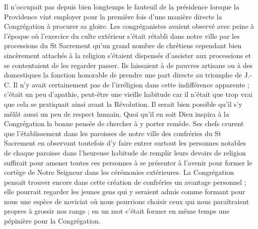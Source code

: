 Il n'occupait pas depuis bien longtemps le fauteuil de la présidence lorsque la Providence vint employer pour la première fois d'une manière directe la Congrégation à procurer sa gloire. Les congréganistes avaient observé avec peine à l'époque où l'exercice du culte extérieur s'était rétabli dans notre ville par les processions du St Sacrement qu'un grand nombre de chrétiens cependant bien sincèrement attachés à la religion s'étaient dispensés d'assister aux processions et se contentaient de les regarder passer. Ils laissaient à de pauvres artisans ou à des domestiques la fonction honorable de prendre une part directe au triomphe de J.-C. Il n'y avait certainement pas de l'irréligion dans cette indifférence apparente ; c'était un peu d'apathie, peut-être une vieille habitude car il n'était que trop vrai que cela se pratiquait ainsi avant la Révolution. Il serait bien possible qu'il s'y mêlât aussi un peu de respect humain. Quoi qu'il en soit Dieu inspira à la Congrégation la bonne pensée de chercher à y porter remède. Ses chefs crurent que l'établissement dans les paroisses de notre ville des confréries
du St Sacrement en observant toutefois d'y faire entrer surtout les personnes notables de chaque paroisse dans l'heureuse habitude de remplir leurs devoirs de religion suffirait pour amener toutes ces personnes à se présenter à l'avenir pour former le cortège de Notre Seigneur dans les cérémonies extérieures. La Congrégation pensait trouver encore dans cette création de confréries un avantage personnel ; elle pourrait regarder les jeunes gens qui y seraient admis comme formant pour nous une espèce de noviciat où nous pourrions choisir ceux qui nous paraîtraient propres à grossir nos rangs ; en un mot c'était former en même temps une pépinière pour la Congrégation.

